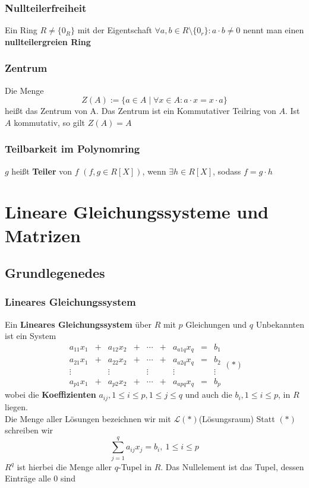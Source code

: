 \documentclass{kit}
\begin{document}
    \subsubsection{Nullteilerfreiheit}
      Ein Ring $R\neq\{0_R\}$ mit der Eigentschaft $\forall a,b\in R\setminus\{0_r\}:a\cdot b\neq0$ nennt man einen \textbf{nullteilergreien Ring}
    \subsubsection{Zentrum}
      Die Menge
      $$Z(A):=\{a\in A\mid\forall x\in A:a\cdot x=x\cdot a\}$$
      heißt das Zentrum von A. Das Zentrum ist ein Kommutativer Teilring von $A$. Ist $A$ kommutativ, so gilt $Z(A)=A$
    \subsubsection{Teilbarkeit im Polynomring}
      $g$ heißt \textbf{Teiler} von $f$ $(f,g\in R[X])$, wenn $\exists h\in R[X]$, sodass $f=g\cdot h$
\section{Lineare Gleichungssysteme und Matrizen}
  \subsection{Grundlegenedes}
    \subsubsection{Lineares Gleichungssystem}
      Ein \textbf{Lineares Gleichungssystem} über $R$ mit $p$ Gleichungen und $q$ Unbekannten ist ein System
      $$\begin{matrix}
        a_{11}x_1 & + & a_{12}x_2 & + & \cdots & + & a_{a1q}x_q & = & b_1\\
        a_{21}x_1 & + & a_{22}x_2 & + & \cdots & + & a_{a2q}x_q & = & b_2\\
        \vdots & & \vdots & & \vdots & & \vdots & & \vdots\\
        a_{p1}x_1 & + & a_{p2}x_2 & + & \cdots & + & a_{apq}x_q & = & b_p
      \end{matrix}(*)$$
      wobei die \textbf{Koeffizienten} $a_{ij},1\le i\le p,1\le j\le q$ und auch die $b_i,1\le i\le p$, in $R$ liegen.\\
      Die Menge aller Lösungen bezeichnen wir mit $\mathcal{L}(*)$(Lösungsraum)
      Statt $(*)$ schreiben wir 
      $$\sum_{j=1}^qa_{ij}x_j=b_i,\ 1\le i\le p$$
      $R^q$ ist hierbei die Menge aller $q$-Tupel in $R$. Das Nullelement ist das Tupel, dessen Einträge alle 0 sind
\end{document}
